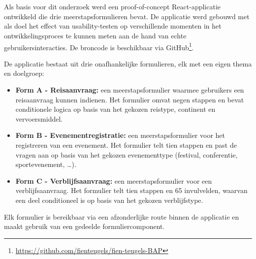 
\chapter{}%
\label{ch:poc}

\section{}

Als basis voor dit onderzoek werd een proof-of-concept React-applicatie ontwikkeld die drie meerstapsformulieren bevat. De applicatie werd gebouwd met als doel het effect van usability-testen op verschillende momenten in het ontwikkelingsproces te kunnen meten aan de hand van echte gebruikersinteracties. De broncode is beschikbaar via GitHub\footnote{\url{https://github.com/fienteugels/fien-teugels-BAP}}.

De applicatie bestaat uit drie onafhankelijke formulieren, elk met een eigen thema en doelgroep:

\begin{itemize}
  \item \textbf{Form A - Reisaanvraag:} een meerstapsformulier waarmee gebruikers een reisaanvraag kunnen indienen. Het formulier omvat negen stappen en bevat conditionele logica op basis van het gekozen reistype, continent en vervoersmiddel.
  \item \textbf{Form B - Evenementregistratie:} een meerstapsformulier voor het registreren van een evenement. Het formulier telt tien stappen en past de vragen aan op basis van het gekozen evenementtype (festival, conferentie, sportevenement, \ldots).
  \item \textbf{Form C - Verblijfsaanvraag:} een meerstapsformulier voor een verblijfsaanvraag. Het formulier telt tien stappen en 65 invulvelden, waarvan een deel conditioneel is op basis van het gekozen verblijfstype.
\end{itemize}

Elk formulier is bereikbaar via een afzonderlijke route binnen de applicatie en maakt gebruik van een gedeelde formuliercomponent.

